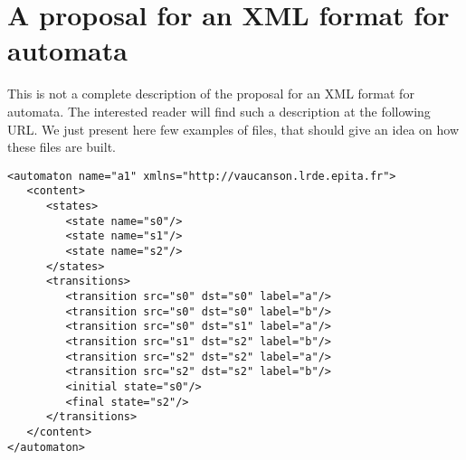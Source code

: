 \chapter{A proposal for an XML format for automata}
\label{sec:xml}

This is not a complete description of the \Vauc proposal for an XML
format for automata.  The interested reader will find such a
description at the following URL.  We just present here few examples
of files, that should give an idea on how these files are built.

\begin{lstlisting}
<automaton name="a1" xmlns="http://vaucanson.lrde.epita.fr">
   <content>
      <states>
         <state name="s0"/>
         <state name="s1"/>
         <state name="s2"/>
      </states>
      <transitions>
         <transition src="s0" dst="s0" label="a"/>
         <transition src="s0" dst="s0" label="b"/>
         <transition src="s0" dst="s1" label="a"/>
         <transition src="s1" dst="s2" label="b"/>
         <transition src="s2" dst="s2" label="a"/>
         <transition src="s2" dst="s2" label="b"/>
         <initial state="s0"/>
         <final state="s2"/>
      </transitions>
   </content>
</automaton>
\end{lstlisting}

